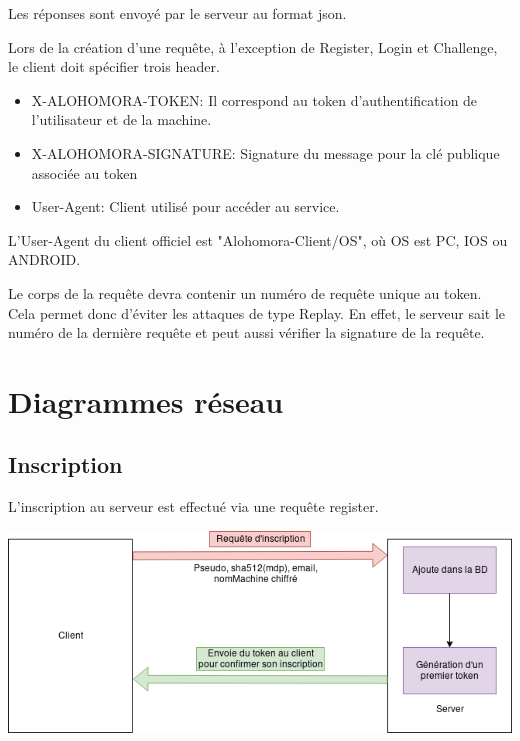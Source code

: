 \documentclass[oneside]{report}
\begin{document}
	\par Les réponses sont envoyé par le serveur au format json.\\
	\vspace{1cm}
	\par Lors de la création d'une requête, à l'exception de Register, Login et Challenge, le client doit spécifier trois header.
	\begin{itemize}
		\item X-ALOHOMORA-TOKEN: Il correspond au token d'authentification de l'utilisateur et de la machine.
		\item X-ALOHOMORA-SIGNATURE: Signature du message pour la clé publique associée au token
		\item User-Agent: Client utilisé pour accéder au service.
	\end{itemize}

	\vspace{.5cm}
	\par L'User-Agent du client officiel est "Alohomora-Client/{OS}", où OS est PC, IOS ou ANDROID.
	\vspace{.5cm}
	\par Le corps de la requête devra contenir un numéro de requête unique au token. Cela permet donc d'éviter les attaques de type Replay. En effet, le serveur sait le numéro de la dernière requête et peut aussi vérifier la signature de la requête.
	

	\chapter{Diagrammes réseau}
	\vspace{1cm}
	\section{Inscription}{
		\par L'inscription au serveur est effectué via une requête register.\\
		\vspace{.5cm}
		\begin{center}
			\includegraphics[scale=.5]{reseau_register}
		\end{center}
	}
\end{document}
